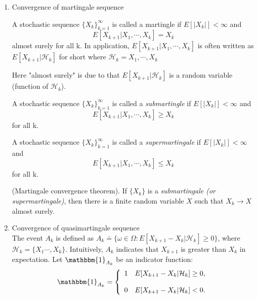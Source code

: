   \begin{enumerate}

    \item
          Convergence of martingale sequence
          \begin{definition}
            A stochastic sequence $\{X_{k}\}^{\infty}_{k=1}$ is called a martingle if $E[|X_{k}|] < \infty$ and
            \begin{equation*}
              E \left[X_{k+1}|X_{1},\cdots,X_{k}\right] = X_{k}
            \end{equation*}
            almost surely for all k. In application, $E \left[X_{k+1}|X_{1},\cdots,X_{k}\right]$ is often written as $E
              \left[X_{k+1}|\mathcal{H}_{k}\right]$ for short where $\mathcal{H}_{k}={X_{1},\cdots,X_{k}}$
          \end{definition}
          Here "almost surely" is due to that $E[X_{k+1}|\mathcal{H}_{k}]$ is a random variable (function of $\mathcal{H}_{k}$).
          \begin{definition}
            A stochastic sequence $\{X_{k}\}^{\infty}_{k=1}$ is called a \textit{submartingle} if $E[|X_{k}|] < \infty$ and
            \begin{equation*}
              E \left[X_{k+1}|X_{1},\cdots,X_{k}\right] \ge X_{k}
            \end{equation*}
            for all k.
          \end{definition}
          \begin{definition}
            A stochastic sequence $\{X_{k}\}^{\infty}_{k=1}$ is called a \textit{supermartingale} if $E[|X_{k}|] < \infty$ and
            \begin{equation*}
              E \left[X_{k+1}|X_{1},\cdots,X_{k}\right] \le X_{k}
            \end{equation*}
            for all k.
          \end{definition}
          \begin{theorem}{(Martingale convergence theorem).}
            If $\{X_{k}\}$ is a \textit{submartingale (or supermartingale)}, then there is a finite random variable $X$ such
            that $X_{k} \to X$ almost surely.
          \end{theorem}
    \item
          Convergence of quasimartingale sequence \\ The event $A_{k}$ is defined as $A_{k} \doteq \{\omega \in \Omega:
            E[X_{k+1}-X_{k}| \mathcal{H}_{k}] \ge 0\}$, where $\mathcal{H}_k=\{X_{1}\cdots,X_{k}\}$. Intuitively, $A_{k}$
          indicates that $X_{k+1}$ is greater than $X_{k}$ in expectation. Let $\mathbbm{1}_{A_{k}}$ be an indicator function:
          \begin{equation*}
            \mathbbm{1}_{A_{k}} = \left\{
            \begin{array}{rl}
              1 & E[X_{k+1}-X_{k}|\mathcal{H}_{k}] \ge 0, \\ \\ 0 & E[X_{k+1}-X_{k}|\mathcal{H}_{k}] < 0.
            \end{array}
            \right.
          \end{equation*}


\end{enumerate}
